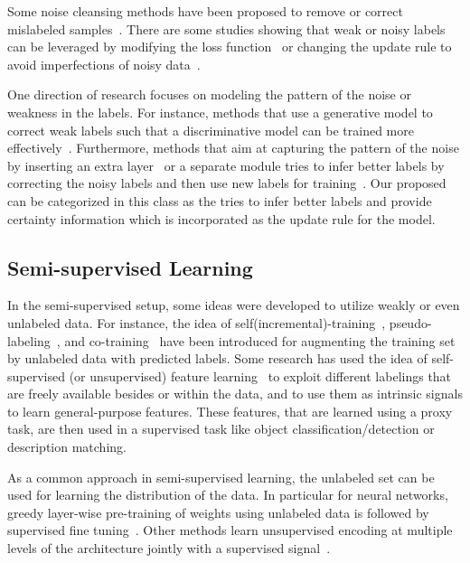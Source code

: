 Some noise cleansing methods have been proposed to remove or correct mislabeled samples~\citep{Brodley:1999}.
There are some studies showing that weak or noisy labels can be leveraged by modifying the loss function~\citep{reed2014training, Patrini:2016, patrini2016loss, Vahdat:2017} or changing the update rule to avoid imperfections of noisy data~\citep{malach2017decoupling, Dehghani:2017:nips_metalearn, Dehghani:2017avoiding}.  

One direction of research focuses on modeling the pattern of the noise or weakness in the labels. For instance, methods that use a generative model to correct weak labels such that a discriminative model can be trained more effectively~\citep{Ratner:2016,Rekatsinas:2017,Varma:2017}.
Furthermore, methods that aim at capturing the pattern of the noise by inserting an extra layer~\citep{goldberger2016training} or a separate module tries to infer better labels by correcting the noisy labels and then use new labels for training~\citep{Sukhbaatar:2014,Veit:2017, Dehghani:2017:nips_metalearn}. Our proposed \fwl can be categorized in this class as the \tch tries to infer better labels and provide certainty information which is incorporated as the update rule for the \std model.

\subsection{Semi-\:supervised Learning}
In the semi-supervised setup, some ideas were developed to utilize weakly or even unlabeled data. For instance, the idea of self(incremental)-training~\citep{Rosenberg:2005}, pseudo-labeling~\citep{Lee:2013,Hinton:2015}, and co-training~\citep{Blum:1998} have been introduced for augmenting the training set by unlabeled data with predicted labels.
Some research has used the idea of self-supervised (or unsupervised) feature learning~\citep{noroozi2016unsupervised,dosovitskiy2016discriminative,donahue2016adversarial} to exploit different labelings that are freely available besides or within the data, and to use them as intrinsic signals to learn general-purpose features. These features, that are learned using a proxy task, are then used in a supervised task like object classification/detection or description matching.

As a common approach in semi-supervised learning, the unlabeled set can be used for learning the distribution of the data. In particular for neural networks, greedy layer-wise pre-training of weights using unlabeled data is followed by supervised fine tuning~\citep{Hinton:2006,Deriu:2017,Severyn:2015:SemEval,Severyn:2015:SIGIR,Go:2009}. Other methods learn unsupervised encoding at multiple levels of the architecture jointly with a supervised signal~\citep{Ororbia:2015,Weston:2012}.


